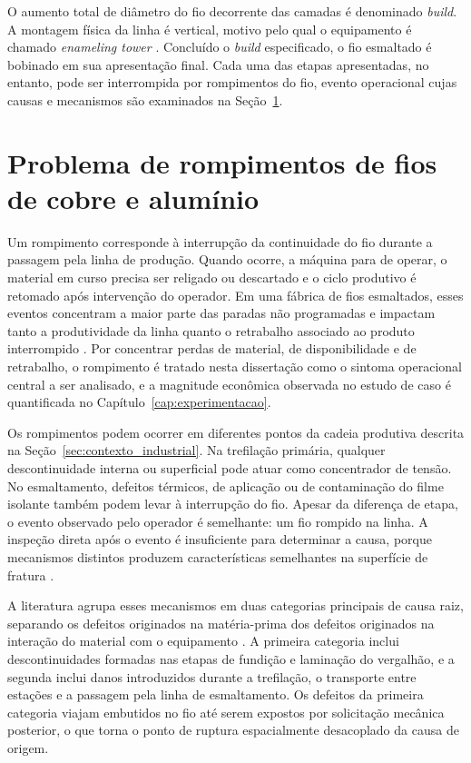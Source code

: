 O aumento total de diâmetro do fio decorrente das camadas é denominado \emph{build}. A montagem física da linha é vertical, motivo pelo qual o equipamento é chamado \emph{enameling tower} \cite{wright2011wire}. Concluído o \emph{build} especificado, o fio esmaltado é bobinado em sua apresentação final. Cada uma das etapas apresentadas, no entanto, pode ser interrompida por rompimentos do fio, evento operacional cujas causas e mecanismos são examinados na Seção~\ref{sec:problema_rompimentos}.


\section{Problema de rompimentos de fios de cobre e alumínio}
\label{sec:problema_rompimentos}


Um rompimento corresponde à interrupção da continuidade do fio durante a passagem pela linha de produção. Quando ocorre, a máquina para de operar, o material em curso precisa ser religado ou descartado e o ciclo produtivo é retomado após intervenção do operador. Em uma fábrica de fios esmaltados, esses eventos concentram a maior parte das paradas não programadas e impactam tanto a produtividade da linha quanto o retrabalho associado ao produto interrompido \cite{zasadzinska2022defects}. Por concentrar perdas de material, de disponibilidade e de retrabalho, o rompimento é tratado nesta dissertação como o sintoma operacional central a ser analisado, e a magnitude econômica observada no estudo de caso é quantificada no Capítulo~\ref{cap:experimentacao}.

Os rompimentos podem ocorrer em diferentes pontos da cadeia produtiva descrita na Seção~\ref{sec:contexto_industrial}. Na trefilação primária, qualquer descontinuidade interna ou superficial pode atuar como concentrador de tensão. No esmaltamento, defeitos térmicos, de aplicação ou de contaminação do filme isolante também podem levar à interrupção do fio. Apesar da diferença de etapa, o evento observado pelo operador é semelhante: um fio rompido na linha. A inspeção direta após o evento é insuficiente para determinar a causa, porque mecanismos distintos produzem características semelhantes na superfície de fratura \cite{karabay2018failure}.

A literatura agrupa esses mecanismos em duas categorias principais de causa raiz, separando os defeitos originados na matéria-prima dos defeitos originados na interação do material com o equipamento \cite{karabay2018failure}. A primeira categoria inclui descontinuidades formadas nas etapas de fundição e laminação do vergalhão, e a segunda inclui danos introduzidos durante a trefilação, o transporte entre estações e a passagem pela linha de esmaltamento. Os defeitos da primeira categoria viajam embutidos no fio até serem expostos por solicitação mecânica posterior, o que torna o ponto de ruptura espacialmente desacoplado da causa de origem.

